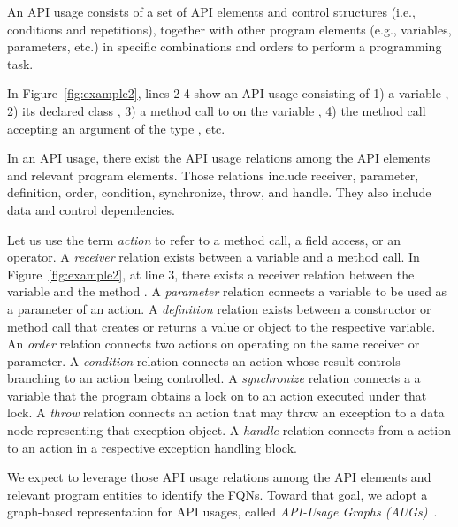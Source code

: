 \begin{Definition}
An API usage consists of a set of API elements and control structures
(i.e., conditions and repetitions), together with other program
elements (e.g., variables, parameters, etc.) in specific combinations
and orders to perform a programming task.
\end{Definition}

In Figure~\ref{fig:example2}, lines 2-4 show an API usage consisting
of 1) a variable , 2) its declared class ,
3) a method call to  on the variable
, 4) the method call  accepting an
argument of the type , etc.

\begin{Definition}
  In an API usage, there exist the API usage relations among the API
  elements and relevant program elements. Those relations include
  receiver, parameter, definition, order, condition, synchronize,
  throw, and handle. They also include data and control dependencies.
\end{Definition}

Let us use the term {\em action} to refer to a method call, a field
access, or an operator. A {\em receiver} relation exists between a
variable and a method call. In Figure~\ref{fig:example2},
at line 3, there exists a receiver relation between the variable
 and the method . A {\em
  parameter} relation connects a variable to be used as a parameter of
an action. A {\em definition} relation exists between a constructor or
method call that creates or returns a value or object to the
respective variable. An {\em order} relation connects two actions on
operating on the same receiver or parameter. A {\em condition}
relation connects an action whose result controls branching to an
action being controlled. A {\em synchronize} relation connects a a
variable that the program obtains a lock on to an action executed
under that lock. A {\em throw} relation connects an action that may
throw an exception to a data node representing that exception
object. A {\em handle} relation connects from a  action to
an action in a respective exception handling block.

We expect to leverage those API usage relations among the API elements
and relevant program entities to identify the FQNs. Toward that goal,
we adopt a graph-based representation for API usages, called {\em
  API-Usage Graphs (AUGs)}~\cite{msr19}.

